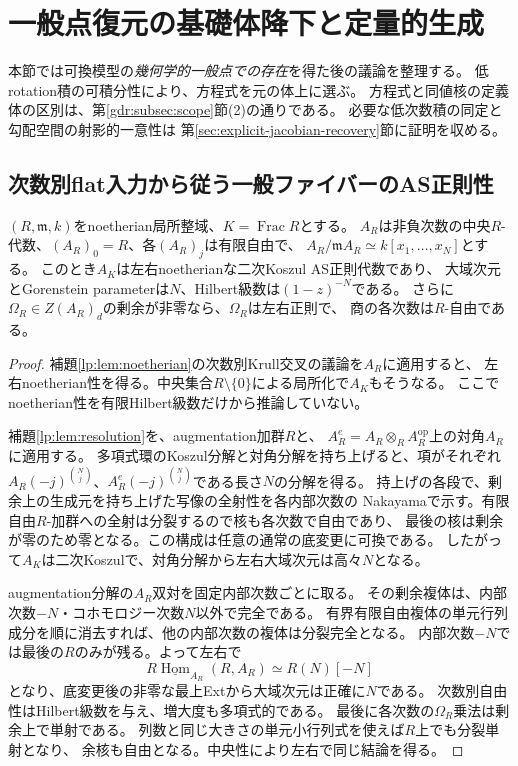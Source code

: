 \section{一般点復元の基礎体降下と定量的生成}
\label{gcd:sec:descent}

本節では可換模型の\emph{幾何学的一般点での存在}を得た後の議論を整理する。
低rotation積の可積分性により、方程式を元の体上に選ぶ。
方程式と同値核の定義体の区別は、第\ref{gdr:subsec:scope}節(2)の通りである。
必要な低次数積の同定と勾配空間の射影的一意性は
第\ref{sec:explicit-jacobian-recovery}節に証明を収める。

\subsection{次数別flat入力から従う一般ファイバーのAS正則性}

\begin{proposition}[一般点のambientに対する追加仮定の除去]
\label{gcd:prop:automatic-as}
$(R,\mathfrak m,k)$をnoetherian局所整域、$K=\operatorname{Frac}R$とする。
$A_R$は非負次数の中央$R$-代数、$(A_R)_0=R$、各$(A_R)_j$は有限自由で、
$A_R/\mathfrak mA_R\simeq k[x_1,\ldots,x_N]$とする。
このとき$A_K$は左右noetherianな二次Koszul AS正則代数であり、
大域次元とGorenstein parameterは$N$、Hilbert級数は$(1-z)^{-N}$である。
さらに$\Omega_R\in Z(A_R)_d$の剰余が非零なら、$\Omega_R$は左右正則で、
商の各次数は$R$-自由である。
\end{proposition}
\begin{proof}
補題\ref{lp:lem:noetherian}の次数別Krull交叉の議論を$A_R$に適用すると、
左右noetherian性を得る。中央集合$R\setminus\{0\}$による局所化で$A_K$もそうなる。
ここでnoetherian性を有限Hilbert級数だけから推論していない。

補題\ref{lp:lem:resolution}を、augmentation加群$R$と、
$A_R^e=A_R\otimes_RA_R^{\mathrm{op}}$上の対角$A_R$に適用する。
多項式環のKoszul分解と対角分解を持ち上げると、項がそれぞれ
$A_R(-j)^{\binom Nj}$、$A_R^e(-j)^{\binom Nj}$である長さ$N$の分解を得る。
持上げの各段で、剰余上の生成元を持ち上げた写像の全射性を各内部次数の
Nakayamaで示す。有限自由$R$-加群への全射は分裂するので核も各次数で自由であり、
最後の核は剰余が零のため零となる。この構成は任意の通常の底変更に可換である。
したがって$A_K$は二次Koszulで、対角分解から左右大域次元は高々$N$となる。

augmentation分解の$A_R$双対を固定内部次数ごとに取る。
その剰余複体は、内部次数$-N$・コホモロジー次数$N$以外で完全である。
有界有限自由複体の単元行列成分を順に消去すれば、他の内部次数の複体は分裂完全となる。
内部次数$-N$では最後の$R$のみが残る。よって左右で
\begin{equation}\label{gcd:eq:as}
 R\underline{\operatorname{Hom}}_{A_R}(R,A_R)\simeq R(N)[-N]
\end{equation}
となり、底変更後の非零な最上Extから大域次元は正確に$N$である。
次数別自由性はHilbert級数を与え、増大度も多項式的である。
最後に各次数の$\Omega_R$乗法は剰余上で単射である。
列数と同じ大きさの単元小行列式を使えば$R$上でも分裂単射となり、
余核も自由となる。中央性により左右で同じ結論を得る。
\end{proof}

